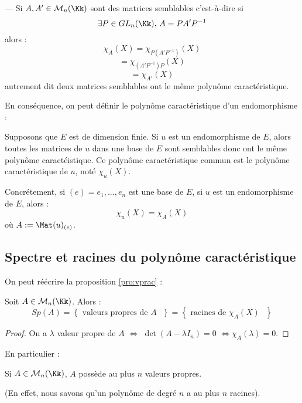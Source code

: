 \documentclass[class=report,crop=false]{standalone}
\newcommand{\GL}{GL}
\newcommand{\Sp}{Sp}
\begin{document}
\begin{remarque*}
--- Si $A,A' \in \mathcal{M}_n(\Kk)$ sont des matrices semblables c'est-à-dire si \[\exists P \in \GL_n(\Kk),\, A = PA'P^{-1}\]
alors :
\[\chi_{A}(X) = \chi_{P(A'P^{-1})}(X)\]
\[=\chi_{(A'P^{-1})P}(X) \]
\[= \chi_{A'}(X)\]
autrement dit deux matrices semblables ont le même polynôme caractéristique.
\end{remarque*}

En conséquence, on peut définir le polynôme caractéristique d'un endomorphisme :
\begin{definition}
Supposons que $E$ est de dimension finie. Si $u$ est un endomorphisme de $E$, alors toutes les matrices de $u$ dans une base de $E$ sont semblables donc ont le même polynôme caractéistique. Ce polynôme caractéristique commun est le polynôme caractéristique de $u$, noté $\chi_u(X)$.
\end{definition}

Concrétement, si $(e)= e_1,...,e_n$ est une base de $E$, si $u$ est un endomorphisme de $E$, alors :
\[\chi_u(X) = \chi_A(X)\]
où $A:= \Mat(u)_{(e)}$.
\subsection*{Spectre et racines du polynôme caractéristique}

On peut réécrire la proposition \ref{pro:vprac} :

\begin{theoreme}
Soit $A \in \mathcal{M}_n(\Kk)$. Alors :
\[\Sp(A) = \left\{ \mbox{ valeurs propres de $A$ }\right\} = \left\{ \mbox{ racines de $\chi_A(X)$ }\right\}\]
\end{theoreme}

\begin{proof}
On a $\lambda$ valeur propre de $A$ $\iff$ $\det (A -\lambda I_n) = 0$ $\iff \chi_A(\lambda) = 0$.
\end{proof}

En particulier :

\begin{corollaire}
Si $A \in \mathcal{M}_n(\Kk)$, $A$ possède au plus $n$ valeurs propres. 
\end{corollaire}

(En effet, nous savons qu'un polynôme de degré $n$ a au plus $n$ racines).
\end{document}
